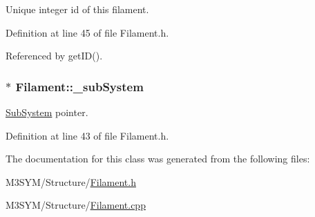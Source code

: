 Unique integer id of this filament. 



Definition at line 45 of file Filament.\+h.



Referenced by get\+I\+D().

\hypertarget{classFilament_acfb35439bafc3940ae7ffdbb68ae3144}{
\subsubsection[{\+\_\+sub\+System}]{$\ast$ Filament\+::\+\_\+sub\+System\hspace{0.3cm}{\ttfamily [private]}}}\label{classFilament_acfb35439bafc3940ae7ffdbb68ae3144}


\hyperlink{classSubSystem}{Sub\+System} pointer. 



Definition at line 43 of file Filament.\+h.



The documentation for this class was generated from the following files\+:\begin{DoxyCompactItemize}
\item 
M3\+S\+Y\+M/\+Structure/\hyperlink{Filament_8h}{Filament.\+h}\item 
M3\+S\+Y\+M/\+Structure/\hyperlink{Filament_8cpp}{Filament.\+cpp}\end{DoxyCompactItemize}
